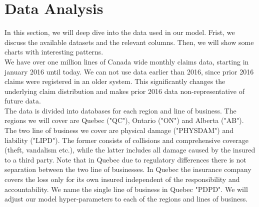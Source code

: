 \section{Data Analysis}\label{Section_dataAnalysis}
In this section, we will deep dive into the data used in our model. Frist, we discuss the available datasets and the relevant columns. Then, we will show some charts with interesting patterns.\\

We have over one million lines of Canada wide monthly claims data, starting in january 2016 until today. We can not use data earlier than 2016, since prior 2016 claims were registered in an older system. This significantly changes the underlying claim distribution and makes prior 2016 data non-representative of future data.\\
The data is divided into databases for each region and line of business. The regions we will cover are Quebec ("QC"), Ontario ("ON") and Alberta ("AB"). The two line of business we cover are physical damage ("PHYSDAM") and liability ("LIPD"). The former consists of collisions and comprehensive coverage (theft, vandalism etc.), while the latter includes all damage caused by the insured to a third party. Note that in Quebec due to regulatory differences there is not separation between the two line of businesses. In Quebec the insurance company covers the loss only for its own insured independent of the responsibility and accountability. We name the single line of business in Quebec "PDPD". We will adjust our model hyper-parameters to each of the regions and lines of business. \\

